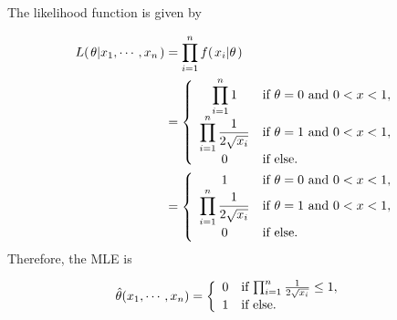 \documentclass[12pt,letterpaper,reqno]{amsart}
\numberwithin{equation}{subsection}
\begin{document}
The likelihood function is given by

\begin{align*}
    {L}\! \left( {\left. {\theta} \middle| {x_1, \cdots, x_n} \right.} \right) &= \prod_{i=1}^n {f}\! \left( {\left. {x_i} \middle| {\theta} \right.} \right) \\
    &= \left\{ \begin{array}{cl}
        \displaystyle \prod_{i=1}^n 1 & \mbox{if $\theta = 0$ and $0 < x < 1$}, \\
        \displaystyle \prod_{i=1}^n \frac{1}{2 \sqrt{x_i}} & \mbox{if $\theta = 1$ and $0 < x < 1$}, \\
        0 & \mbox{if else}.
    \end{array} \right. \\
        &= \left\{ \begin{array}{cl}
        1 & \mbox{if $\theta = 0$ and $0 < x < 1$}, \\
        \displaystyle \prod_{i=1}^n \frac{1}{2 \sqrt{x_i}} & \mbox{if $\theta = 1$ and $0 < x < 1$}, \\
        0 & \mbox{if else}.
    \end{array} \right.
\end{align*}
Therefore, the MLE is

\begin{align*}
    {\hat{\theta}}\! \left( {x_1, \cdots, x_n} \right) &= \left\{ \begin{array}{cl}
         0 & \mbox{if $\prod_{i=1}^n \frac{1}{2 \sqrt{x_i}} \leq 1$}, \\
         1 & \mbox{if else}.
    \end{array} \right.
\end{align*}

\newpage
\nocite{*}
\printbibliography
\end{document}
